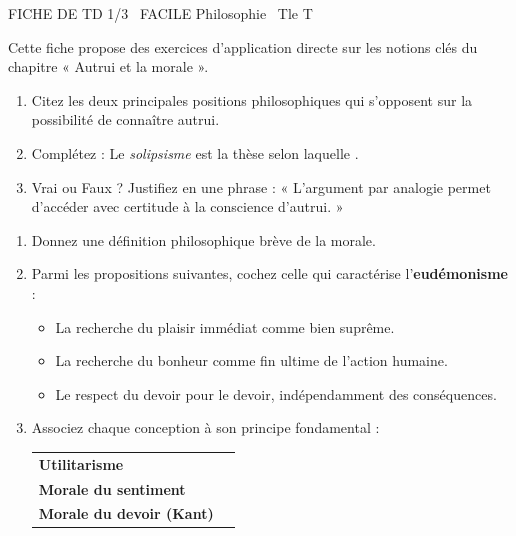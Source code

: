 \documentclass[11pt]{article}
\begin{document}
\begin{tcolorbox}[enhanced,colback=popink,colframe=popink,arc=10pt,boxrule=0pt,left=12pt,right=12pt,top=9pt,bottom=9pt]
{\color{white}\popxbold\small FICHE DE TD 1/3 \textbullet\ FACILE \hfill Philosophie \textbullet\ Tle T\par}
\end{tcolorbox}
\vspace{4pt}
Cette fiche propose des exercices d'application directe sur les notions clés du chapitre « Autrui et la morale ».

\begin{exercice}
\begin{enumerate}
    \item Citez les deux principales positions philosophiques qui s'opposent sur la possibilité de connaître autrui.
    \item Complétez : Le \textit{solipsisme} est la thèse selon laquelle \underline{\hspace{5cm}}.
    \item Vrai ou Faux ? Justifiez en une phrase : « L'argument par analogie permet d'accéder avec certitude à la conscience d'autrui. »
\end{enumerate}
\end{exercice}

\begin{exercice}
\begin{enumerate}
    \item Donnez une définition philosophique brève de la morale.
    \item Parmi les propositions suivantes, cochez celle qui caractérise l'\textbf{eudémonisme} :
    \begin{itemize}
        \item[A.] La recherche du plaisir immédiat comme bien suprême.
        \item[B.] La recherche du bonheur comme fin ultime de l'action humaine.
        \item[C.] Le respect du devoir pour le devoir, indépendamment des conséquences.
    \end{itemize}
    \item Associez chaque conception à son principe fondamental :
    \begin{tabular}{ll}
    \textbf{Utilitarisme} & \underline{\hspace{4cm}} \\
    \textbf{Morale du sentiment} & \underline{\hspace{4cm}} \\
    \textbf{Morale du devoir (Kant)} & \underline{\hspace{4cm}}
    \end{tabular}
\end{enumerate}
\end{exercice}
\end{document}
